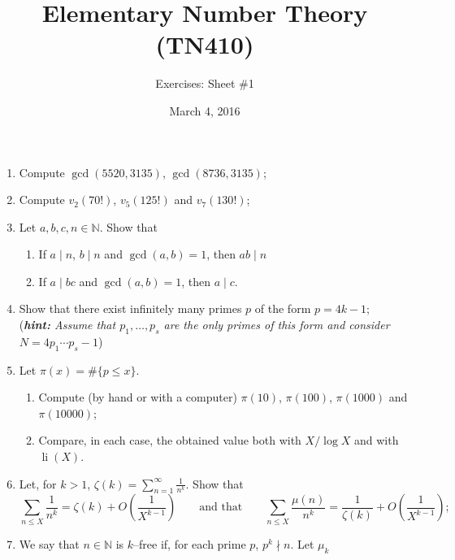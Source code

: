 \documentclass[a4paper,10pt]{article}
\title{Elementary Number Theory (TN410)}
\author{Exercises: Sheet \#1}
\date{March 4, 2016}
\begin{document}
\maketitle



\thispagestyle{empty}
\begin{enumerate}
 \item Compute $\gcd(5520,3135)$, $\gcd(8736,3135)$;
 \item Compute  $v_2(70!)$, $v_5(125!)$ and $v_7(130!)$;
\item Let $a,b,c,n\in \mathbb N$. Show that
\begin{enumerate}
 \item  If $a\mid n$, $b\mid n$ and $\gcd(a,b)=1$, then $ab\mid n$
 \item If $a\mid bc$ and $\gcd(a,b)=1$, then $a\mid c$.
\end{enumerate}
 \item Show that there exist infinitely many primes $p$ of the form $p=4k-1$;\\
\small{(\textit{\textbf{hint:} Assume that $p_1,\ldots,p_s$ are the only primes of this form and consider $N=4p_1\cdots p_s-1$})}
 \item Let $\pi(x)=\#\{p\le x\}$.
 \begin{enumerate}
  \item  Compute (by hand or with a computer) $\pi(10)$, $\pi(100)$, $\pi(1000)$ and $\pi(10000)$;
  \item  Compare, in each case, the obtained value both with  $X/\log X$ and with $\operatorname{li}(X)$.
 \end{enumerate}
\item Let, for $k>1$, $\zeta(k)=\sum_{n=1}^\infty\frac1{n^k}$. Show that
$$\sum_{n\le X}\frac1{n^k}=\zeta(k)+O\left(\frac1{X^{k-1}}\right)\qquad
\text{and that}
\qquad\sum_{n\le X}\frac{\mu(n)}{n^k}=\frac{1}{\zeta(k)}+O\left(\frac1{X^{k-1}}\right);$$
\item We say that $n\in\mathbb N$ is $k$--free if, for each prime $p$, $p^k\nmid n$. Let $\mu_k$ 

\end{enumerate}
\end{document}
